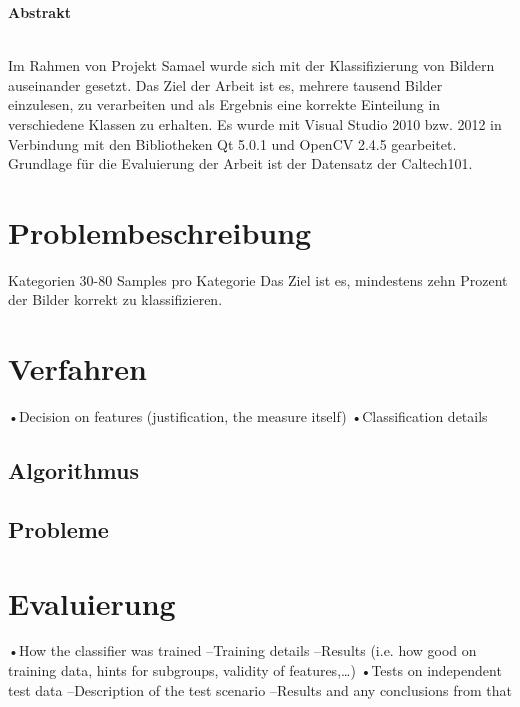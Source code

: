 \documentclass[liststotoc,11pt,a4paper]{article}
\begin{document}
\thispagestyle{empty}
\newpage
\tableofcontents                %
\newpage
\setcounter{page}{1}


\Large \bfseries Abstrakt\\
\normalsize \mdseries
{}
\normalfont
\\Im Rahmen von Projekt Samael wurde sich mit der Klassifizierung von Bildern auseinander gesetzt. Das Ziel der Arbeit ist es, mehrere tausend Bilder einzulesen, zu verarbeiten und als Ergebnis eine korrekte Einteilung in verschiedene Klassen zu erhalten. Es wurde mit Visual Studio 2010 bzw. 2012 in Verbindung mit den Bibliotheken Qt 5.0.1 und OpenCV 2.4.5 gearbeitet. Grundlage für die Evaluierung der Arbeit ist der Datensatz der Caltech101. 


\section{Problembeschreibung}
\label{firstSec}
 Kategorien
30-80 Samples pro Kategorie
Das Ziel ist es, mindestens zehn Prozent der Bilder korrekt zu klassifizieren.



\section{Verfahren}
•Decision on features (justification, the measure itself)
•Classification details

\subsection{Algorithmus}
\subsection{Probleme}

\section{Evaluierung}
•How the classifier was trained
–Training details
–Results (i.e. how good on training data, hints for subgroups, validity of features,…)
•Tests on independent test data
–Description of the test scenario
–Results and any conclusions from that
\end{document}
